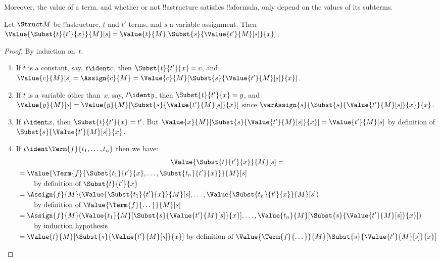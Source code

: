 \documentclass[../../../include/open-logic-section]{subfiles}
\begin{document}
Moreover, the value of a term, and whether or not !!a{structure}
satisfies !!a{formula}, only depend on the values of its subterms.

\begin{prop}
Let $\Struct M$ be !!a{structure}, $t$ and $t'$ terms, and $s$ a
variable assignment. Then $\Value{\Subst{t}{t'}{x}}{M}[s] =
\Value{t}{M}[\Subst{s}{\Value{t'}{M}[s]}{x}]$.
\end{prop}

\begin{proof}
By induction on~$t$.
\begin{enumerate}
\item If $t$ is a constant, say, $t\ident c$, then $\Subst{t}{t'}{x} =
  c$, and $\Value{c}{M}[s] = \Assign{c}{M} =
  \Value{c}{M}[\Subst{s}{\Value{t'}{M}[s]}{x}]$.

\item If $t$ is a variable other than~$x$, say, $t \ident y$, then
  $\Subst{t}{t'}{x} = y$, and $\Value{y}{M}[s] =
  \Value{y}{M}[\Subst{s}{\Value{t'}{M}[s]}{x}]$ since
  $\varAssign{s}{\Subst{s}{\Value{t'}{M}[s]}{x}}{x}$.

\item If $t \ident x$, then $\Subst{t}{t'}{x} = t'$. But
  $\Value{x}{M}[\Subst{s}{\Value{t'}{M}[s]}{x}] = \Value{t'}{M}[s]$ by
  definition of~$\Subst{s}{\Value{t'}{M}[s]}{x}$.

\item If $t \ident \Term{f}{t_1,\dots,t_n}$ then we have:
\begin{multline*}
  \Value{\Subst{t}{t'}{x}}{M}[s]  = \\
  \begin{aligned}[b]
& = \Value{\Term{f}{\Subst{t_1}{t'}{x}, \dots, \Subst{t_n}{t'}{x}}}{M}[s]\\
& \qquad    \text{ by definition of $\Subst{t}{t'}{x}$}\\
& = \Assign{f}{M}(\Value{\Subst{t_1}{t'}{x}}{M}[s], \dots,
    \Value{\Subst{t_n}{t'}{x}}{M}[s])\\
    & \qquad  \text{ by definition of $\Value{\Term{f}{\dots}}{M}[s]$}\\
& = \Assign{f}{M}(\Value{t_1}{M}[\Subst{s}{\Value{t'}{M}[s]}{x}], \dots,
   \Value{t_n}{M}[\Subst{s}{\Value{t'}{M}[s]}{x}])\\
& \qquad    \text{ by induction hypothesis}\\
& = \Value{t}{M}[\Subst{s}{\Value{t'}{M}[s]}{x}]
    \text{ by definition of $\Value{\Term{f}{\dots}}{M}[\Subst{s}{\Value{t'}{M}[s]}{x}]$}
  \end{aligned}
\end{multline*}
\end{enumerate}
\end{proof}
\end{document}
